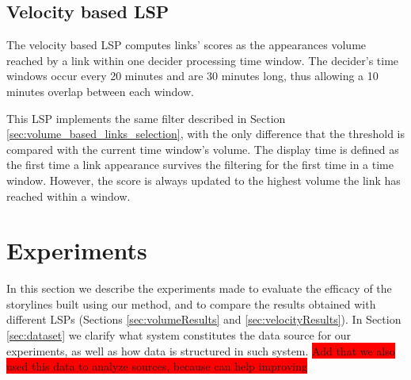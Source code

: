 \documentclass{sig-alternate}
\newcommand{\todo}[1]{\colorbox{red}{#1}}
\begin{document}
\subsection{Velocity based LSP}
\label{sec:velocity_based_links_selection}
The velocity based LSP computes links' scores as the appearances volume reached by a link within one decider processing time window. The decider's time windows occur every 20 minutes and are 30 minutes long, thus allowing a 10 minutes overlap between each window.

This LSP implements the same filter described in Section \ref{sec:volume_based_links_selection}, with the only difference that the threshold is compared with the current time window's volume. The display time is defined as the first time a link appearance survives the filtering for the first time in a time window. However, the score is always updated to the highest volume the link has reached within a window.


\section{Experiments}
\label{sec:experiment}
In this section we describe the experiments made to evaluate the efficacy of the storylines built using our method, and to compare the results obtained with different LSPs (Sections \ref{sec:volumeResults} and \ref{sec:velocityResults}). In Section \ref{sec:dataset} we clarify what system constitutes the data source for our experiments, as well as how data is structured in such system.
\todo{Add that we also used this data to analyze sources, because can help improving}
\end{document}

